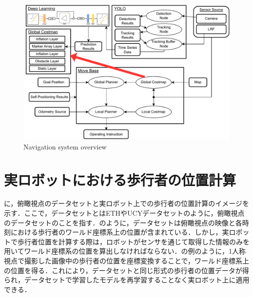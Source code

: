 \begin{figure}[H]
  \centering
 \includegraphics[keepaspectratio, scale=0.77]
      {images/application_system.pdf}
 \caption{Navigation system overview}
 \label{Fig:nav-system}
\end{figure}


\section{実ロボットにおける歩行者の位置計算}\label{sec:real-robot}
に，俯瞰視点のデータセットと実ロボット上での歩行者の位置計算のイメージを示す．ここで，データセットとはETH\cite{pellegrini2009you-eth}やUCY\cite{lerner2007crowds-ucy}データセットのように，俯瞰視点のデータセットのことを指す．のように，データセットは俯瞰視点の映像と各時刻における歩行者のワールド座標系上の位置が含まれている．しかし，実ロボットで歩行者位置を計算する際は，ロボットがセンサを通じて取得した情報のみを用いてワールド座標系の位置を算出しなければならない．の例のように，1人称視点で撮影した画像中の歩行者の位置を座標変換することで，ワールド座標系上の位置を得る．これにより，データセットと同じ形式の歩行者の位置データが得られ，データセットで学習したモデルを再学習することなく実ロボット上に適用できる．

